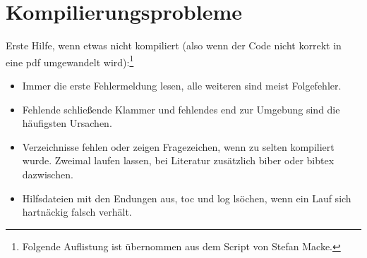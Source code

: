 \chapter{Kompilierungsprobleme}

Erste Hilfe, wenn etwas nicht kompiliert (also wenn der Code nicht korrekt in eine
pdf umgewandelt wird):\footnote{Folgende Auflistung ist übernommen aus dem Script von Stefan Macke.}

\begin{itemize}
    \item Immer die erste Fehlermeldung lesen, alle weiteren sind meist Folgefehler.
    \item Fehlende schließende Klammer und fehlendes end zur Umgebung sind die häufigsten Ursachen.
    \item Verzeichnisse fehlen oder zeigen Fragezeichen, wenn zu selten kompiliert wurde. Zweimal laufen lassen, bei Literatur zusätzlich biber oder bibtex dazwischen.
    \item Hilfsdateien mit den Endungen aus, toc und log lsöchen, wenn ein Lauf sich hartnäckig falsch verhält.
\end{itemize}